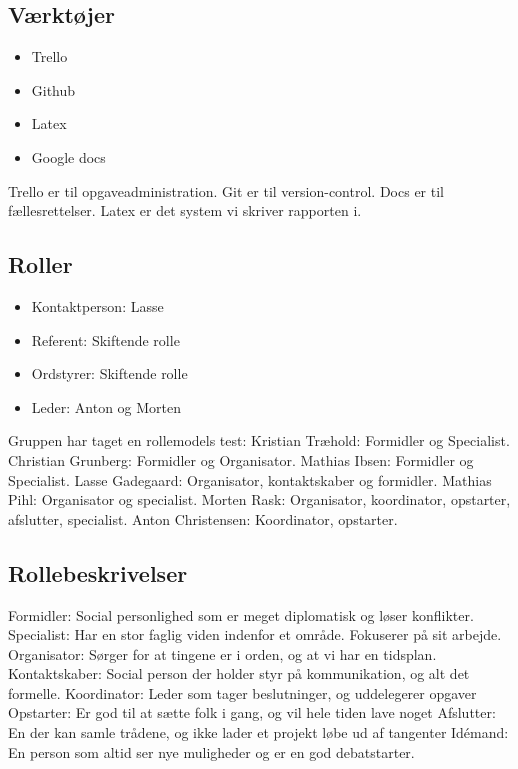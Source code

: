 \documentclass[oneside,a4paper,titlepage]{article}
\begin{document}
\subsection*{Værktøjer}
\begin{itemize}
  \item Trello
  \item Github
  \item Latex
  \item Google docs
\end{itemize}
Trello er til opgaveadministration.
Git er til version-control.
Docs er til fællesrettelser.
Latex er det system vi skriver rapporten i.
\subsection*{Roller}
\begin{itemize}
  \item Kontaktperson: Lasse
  \item Referent: Skiftende rolle
  \item Ordstyrer: Skiftende rolle
  \item Leder: Anton og Morten
\end{itemize}
Gruppen har taget en rollemodels test: \newline
Kristian Træhold: Formidler og Specialist. \newline
Christian Grunberg: Formidler og Organisator.\newline
Mathias Ibsen: Formidler og Specialist.\newline
Lasse Gadegaard: Organisator, kontaktskaber og formidler.\newline
Mathias Pihl: Organisator og specialist.\newline
Morten Rask: Organisator, koordinator, opstarter, afslutter, specialist.\newline
Anton Christensen: Koordinator, opstarter.\newline

\subsection*{Rollebeskrivelser}
Formidler: Social personlighed som er meget diplomatisk og løser konflikter.
Specialist: Har en stor faglig viden indenfor et område. Fokuserer på sit arbejde.
Organisator: Sørger for at tingene er i orden, og at vi har en tidsplan.
Kontaktskaber: Social person der holder styr på kommunikation, og alt det formelle.
Koordinator: Leder som tager beslutninger, og uddelegerer opgaver
Opstarter: Er god til at sætte folk i gang, og vil hele tiden lave noget
Afslutter: En der kan samle trådene, og ikke lader et projekt løbe ud af tangenter
Idémand: En person som altid ser nye muligheder og er en god debatstarter.
\end{document}
